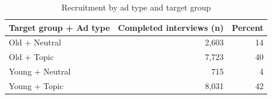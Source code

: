 \begin{table}

\caption{\label{tab:survey-adtype-pooled}Recruitment by ad type and target group}
\centering
\begin{tabular}[t]{lrr}
\toprule
\textbf{Target group + Ad type} & \textbf{Completed interviews (n)} & \textbf{Percent}\\
\midrule
Old + Neutral & 2,603 & 14\\
Old + Topic & 7,723 & 40\\
Young + Neutral & 715 & 4\\
Young + Topic & 8,031 & 42\\
\bottomrule
\end{tabular}
\end{table}
